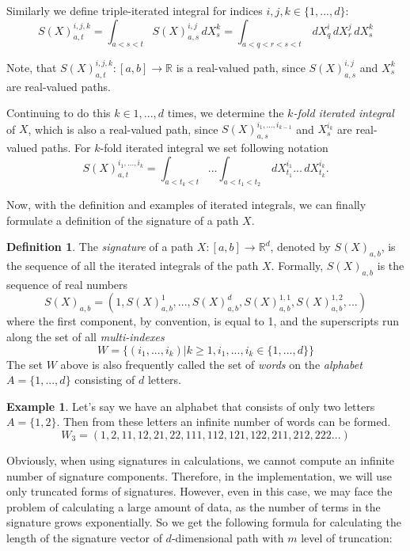\documentclass[12pt,a4paper]{report}
\theoremstyle{definition}
\newtheorem{definition}{Definition}
\newtheorem{example}{Example}
\begin{document}
Similarly we define triple-iterated integral for indices $i,j,k\in \{1,...,d\}$:
\begin{equation}
	S(X)_{a,t}^{i,j,k}=\int_{a<s<t}S(X)_{a,s}^{i,j}\,dX_s^{k}=\int_{a<q<r<s<t}\,dX_q^{i}\,dX_r^{j}\,dX_s^{k}
\end{equation}

Note, that $S(X)_{a,t}^{i,j,k}:[a,b]\rightarrow\mathbb{R}$ is a real-valued path, since $S(X)_{a,s}^{i,j}$ and $X_s^{k}$ are real-valued paths.

Continuing to do this $k\in {1,...,d}$ times, we determine the \textit{$k$-fold iterated integral} of $X$, which is also a real-valued path, since $S(X)_{a,s}^{i_1,...,i_{k-1}}$ and $X_{s}^{i_k}$ are real-valued paths. For $k$-fold iterated integral we set following notation 
\begin{equation}
	S(X)_{a,t}^{i_1,...,i_{k}}=\int_{a<t_k<t}...\int_{a<t_1<t_2}\,dX_{t_1}^{i_1}...\,dX_{t_k}^{i_k}.
\end{equation}

Now, with the definition and examples of iterated integrals, we can finally formulate a definition of the signature of a path $X$.

\begin{definition}
The \textit{signature} of a path $X:[a,b]\rightarrow\mathbb{R}^d$, denoted by $S(X)_{a,b}$, is the sequence of all the iterated integrals of the path $X$. Formally, $S(X)_{a,b}$ is the sequence of real numbers
\begin{equation}
	S(X)_{a,b}=(1,S(X)_{a,b}^{1},...,S(X)_{a,b}^{d},S(X)_{a,b}^{1,1},S(X)_{a,b}^{1,2},...)
\end{equation}
where the first component, by convention,  is equal to 1, and the superscripts run along the set of all \textit{multi-indexes}
\begin{equation}
	W=\{(i_1,...,i_k)|k\geq1, i_1,...,i_k\in \{1,...,d\}\}
\end{equation}
The set $W$ above is also frequently called the set of \textit{words} on the \textit{alphabet} $A =\{1,...,d\}$ consisting of $d$ letters.
\end{definition}
\begin{example}
	Let's say we have an alphabet that consists of only two letters $A =\{1,2\}$. Then from these letters an infinite number of words can be formed.
	\begin{equation}
		W_3=(1,2,11,12,21,22,111,112,121,122,211,212,222...)
	\end{equation}
\end{example}
Obviously, when using signatures in calculations, we cannot compute an infinite number of signature components. Therefore, in the implementation, we will use only truncated forms of signatures. However, even in this case, we may face the problem of calculating a large amount of data, as the number of terms in the signature grows exponentially. So we get the following formula for calculating the length of the signature vector of $d$-dimensional path with $m$ level of truncation:
\end{document}
